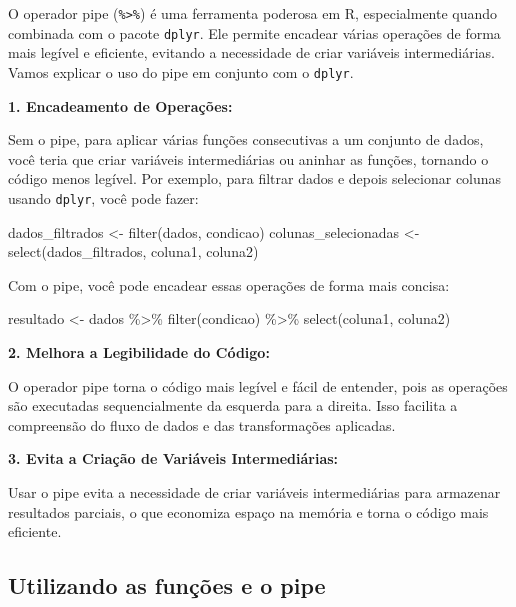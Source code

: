 \documentclass[
  letterpaper,
  DIV=11,
  numbers=noendperiod]{scrreprt}
\newenvironment{Shaded}{\begin{snugshade}}{\end{snugshade}}
\newcommand{\FunctionTok}[1]{\textcolor[rgb]{0.28,0.35,0.67}{#1}}
\newcommand{\NormalTok}[1]{\textcolor[rgb]{0.00,0.23,0.31}{#1}}
\newcommand{\OtherTok}[1]{\textcolor[rgb]{0.00,0.23,0.31}{#1}}
\newcommand{\SpecialCharTok}[1]{\textcolor[rgb]{0.37,0.37,0.37}{#1}}
\begin{document}
O operador pipe (\texttt{\%\textgreater{}\%}) é uma ferramenta poderosa
em R, especialmente quando combinada com o pacote \texttt{dplyr}. Ele
permite encadear várias operações de forma mais legível e eficiente,
evitando a necessidade de criar variáveis intermediárias. Vamos explicar
o uso do pipe em conjunto com o \texttt{dplyr}.

\textbf{1. Encadeamento de Operações:}

Sem o pipe, para aplicar várias funções consecutivas a um conjunto de
dados, você teria que criar variáveis intermediárias ou aninhar as
funções, tornando o código menos legível. Por exemplo, para filtrar
dados e depois selecionar colunas usando \texttt{dplyr}, você pode
fazer:

\begin{Shaded}
\begin{Highlighting}[]
\NormalTok{dados\_filtrados }\OtherTok{\textless{}{-}} \FunctionTok{filter}\NormalTok{(dados, condicao)}
\NormalTok{colunas\_selecionadas }\OtherTok{\textless{}{-}} \FunctionTok{select}\NormalTok{(dados\_filtrados, coluna1, coluna2)}
\end{Highlighting}
\end{Shaded}

Com o pipe, você pode encadear essas operações de forma mais concisa:

\begin{Shaded}
\begin{Highlighting}[]
\NormalTok{resultado }\OtherTok{\textless{}{-}}\NormalTok{ dados }\SpecialCharTok{\%\textgreater{}\%}
  \FunctionTok{filter}\NormalTok{(condicao) }\SpecialCharTok{\%\textgreater{}\%}
  \FunctionTok{select}\NormalTok{(coluna1, coluna2)}
\end{Highlighting}
\end{Shaded}

\textbf{2. Melhora a Legibilidade do Código:}

O operador pipe torna o código mais legível e fácil de entender, pois as
operações são executadas sequencialmente da esquerda para a direita.
Isso facilita a compreensão do fluxo de dados e das transformações
aplicadas.

\textbf{3. Evita a Criação de Variáveis Intermediárias:}

Usar o pipe evita a necessidade de criar variáveis intermediárias para
armazenar resultados parciais, o que economiza espaço na memória e torna
o código mais eficiente.

\subsection{Utilizando as funções e o
pipe}\label{utilizando-as-funuxe7uxf5es-e-o-pipe}
\end{document}
